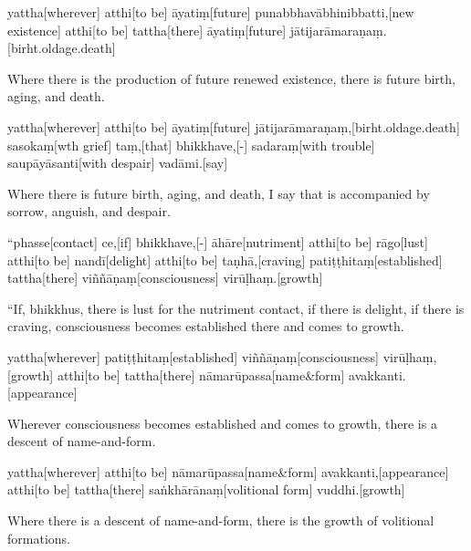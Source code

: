 \begin{samepage}
\begingl[glneveryline={\PaliGlossA,\PaliGlossB}]
yattha[wherever] atthi[to be] āyatiṃ[future] punabbhavābhinibbatti,[new existence] atthi[to be] tattha[there] āyatiṃ[future] jātijarāmaraṇaṃ.[birht.oldage.death]
\endgl
\nopagebreak
\linespread{0.5}
\begin{spacin}{0.2}
{\PaliGlossFT Where there is the production of future renewed existence, there is future birth, aging, and death.}
\end{spacin}
\vskip 12pt
\end{samepage}
\begin{samepage}
\begingl[glneveryline={\PaliGlossA,\PaliGlossB}]
yattha[wherever] atthi[to be] āyatiṃ[future] jātijarāmaraṇaṃ,[birht.oldage.death] sasokaṃ[wth grief] taṃ,[that] bhikkhave,[-] sadaraṃ[with trouble] saupāyāsanti[with despair] vadāmi.[say]
\endgl
\nopagebreak
\linespread{0.5}
\begin{spacin}{0.2}
{\PaliGlossFT Where there is future birth, aging, and death, I say that is accompanied by sorrow, anguish, and despair.}
\end{spacin}
\vskip 12pt
\end{samepage}
\vskip 0.2in
\begin{samepage}
\begingl[glneveryline={\PaliGlossA,\PaliGlossB}]
“phasse[contact] ce,[if] bhikkhave,[-] āhāre[nutriment] atthi[to be] rāgo[lust] atthi[to be] nandī[delight] atthi[to be] taṇhā,[craving] patiṭṭhitaṃ[established] tattha[there] viññāṇaṃ[consciousness] virūḷhaṃ.[growth]
\endgl
\nopagebreak
\linespread{0.5}
\begin{spacin}{0.2}
{\PaliGlossFT “If, bhikkhus, there is lust for the nutriment contact, if there is delight, if there is craving, consciousness becomes established there and comes to growth.}
\end{spacin}
\vskip 12pt
\end{samepage}
\begin{samepage}
\begingl[glneveryline={\PaliGlossA,\PaliGlossB}]
yattha[wherever] patiṭṭhitaṃ[established] viññāṇaṃ[consciousness] virūḷhaṃ,[growth] atthi[to be] tattha[there] nāmarūpassa[name\&form] avakkanti.[appearance]
\endgl
\nopagebreak
\linespread{0.5}
\begin{spacin}{0.2}
{\PaliGlossFT Wherever consciousness becomes established and comes to growth, there is a descent of name-and-form.}
\end{spacin}
\vskip 12pt
\end{samepage}
\begin{samepage}
\begingl[glneveryline={\PaliGlossA,\PaliGlossB}]
yattha[wherever] atthi[to be] nāmarūpassa[name\&form] avakkanti,[appearance] atthi[to be] tattha[there] saṅkhārānaṃ[volitional form] vuddhi.[growth]
\endgl
\nopagebreak
\linespread{0.5}
\begin{spacin}{0.2}
{\PaliGlossFT Where there is a descent of name-and-form, there is the growth of volitional formations.}
\end{spacin}
\vskip 12pt
\end{samepage}
